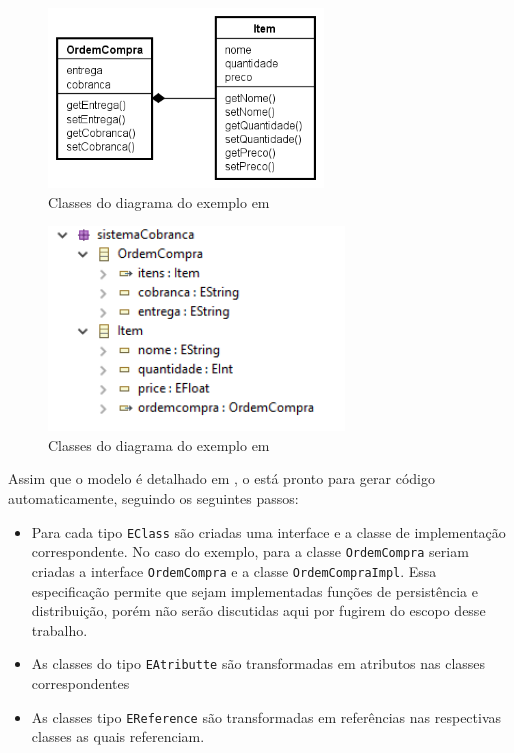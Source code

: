 \begin{figure}[h]
	\centering
	\includegraphics[width=0.65\textwidth]{figuras/exemplos-emf/exemplo-uml.png}
	\caption{Classes do diagrama do exemplo em \uml}
	\label{exemplo-uml}
\end{figure}

\begin{figure}[h]
	\centering
	\includegraphics[width=0.7\textwidth]{figuras/exemplos-emf/exemplo-ecore.PNG}
	\caption{Classes do diagrama do exemplo em \ecore}
	\label{exemplo-ecore}
\end{figure}

Assim que o modelo é detalhado em \ecore, o \emf está pronto para gerar código automaticamente, seguindo os seguintes passos:

\begin{itemize}
	\item Para cada tipo \texttt{EClass} são criadas uma interface e a classe de implementação correspondente. No caso do exemplo, para a classe \texttt{OrdemCompra} seriam criadas a interface \texttt{OrdemCompra} e a classe \texttt{OrdemCompraImpl}. Essa especificação permite que sejam implementadas funções de persistência e distribuição, porém não serão discutidas aqui por fugirem do escopo desse trabalho.
	\item As classes do tipo \texttt{EAtributte} são transformadas em atributos nas classes correspondentes
	\item As classes tipo \texttt{EReference} são transformadas em referências nas respectivas classes as quais referenciam.
\end{itemize}

